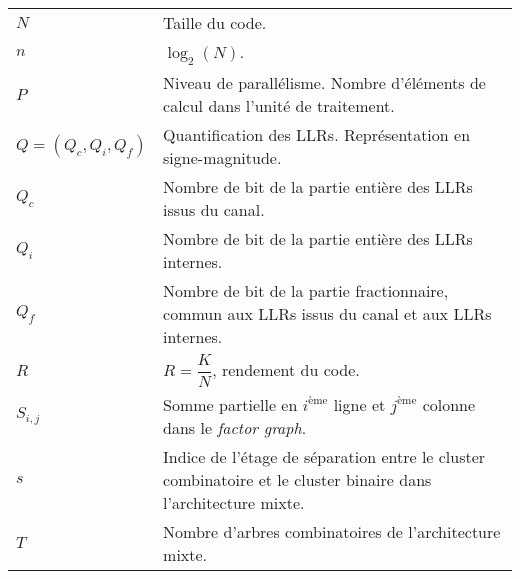 \begin{center}
\begin{longtable}{ p{}  p{} }
    $N$                     & Taille du code.                                                                                                                                                                       \\
    $n$                     & $\log_2(N)$.                                                                                                                                                                          \\
    $P$                     & Niveau de parallélisme. Nombre d'éléments de calcul dans l'unité de traitement.                                                                                                       \\
    $Q=(Q_{c},Q_{i},Q_{f})$ & Quantification des LLRs. Représentation en signe-magnitude.                                                                                                                           \\
    $Q_{c}$                 & Nombre de bit de la partie entière des LLRs issus du canal.                                                                                                                           \\
    $Q_{i}$                 & Nombre de bit de la partie entière des LLRs internes.                                                                                                                                 \\
    $Q_{f}$                 & Nombre de bit de la partie fractionnaire, commun aux LLRs issus du canal et aux LLRs internes.                                                                                        \\
    $R$                     & $R=\dfrac{K}{N}$, rendement du code.                                                                                                                                                  \\
    $S_{i,j}$                & Somme partielle en $i^{\text{ème}}$ ligne et $j^{\text{ème}}$ colonne dans le \textit{factor graph}.                                                                                  \\
    $s$                     & Indice de l'étage de séparation entre le cluster combinatoire et le cluster binaire dans l'architecture mixte.                                                                        \\
    $T$                     & Nombre d'arbres combinatoires de l'architecture mixte.                                                                                                                                \\

\end{longtable}
\end{center}
